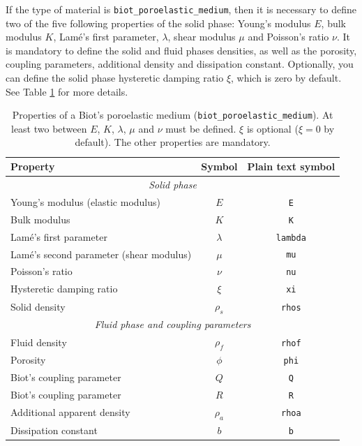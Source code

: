 \documentclass[a4paper,fleqn]{book}
\begin{document}
If the type of material is \texttt{biot\_poroelastic\_medium}, then it is necessary to define two of the five following properties of the solid phase: Young's modulus $E$, bulk modulus $K$, Lam\'e's first parameter, $\lambda$, shear modulus $\mu$ and Poisson's ratio $\nu$. It is mandatory to define the solid and fluid phases densities, as well as the porosity, coupling parameters, additional density and dissipation constant. Optionally, you can define the solid phase hysteretic damping ratio $\xi$, which is zero by default. See Table \ref{tab:poroelastic} for more details.

\begin{table}
\centering
{\small
\begin{tabular}{lcc}
\textbf{Property} & \textbf{Symbol} & \textbf{Plain text symbol} \\
\midrule
\multicolumn{3}{c}{\textit{Solid phase}} \\
\midrule
Young's modulus (elastic modulus)         & $E$       & \texttt{E}      \\
Bulk modulus                              & $K$       & \texttt{K}      \\
Lam\'e's first parameter                  & $\lambda$ & \texttt{lambda} \\
Lam\'e's second parameter (shear modulus) & $\mu$     & \texttt{mu}     \\
Poisson's ratio                           & $\nu$     & \texttt{nu}     \\
Hysteretic damping ratio                  & $\xi$     & \texttt{xi}     \\
Solid density                             & $\rho_s$  & \texttt{rhos}   \\
\midrule
\multicolumn{3}{c}{\textit{Fluid phase and coupling parameters}} \\
\midrule
Fluid density               & $\rho_f$ & \texttt{rhof} \\
Porosity                    & $\phi$   & \texttt{phi}  \\
Biot's coupling parameter   & $Q$      & \texttt{Q}    \\
Biot's coupling parameter   & $R$      & \texttt{R}    \\
Additional apparent density & $\rho_a$ & \texttt{rhoa} \\
Dissipation constant        & $b$      & \texttt{b}    \\
\end{tabular}
}
\caption{Properties of a Biot's poroelastic medium (\texttt{biot\_poroelastic\_medium}). At least two between $E$, $K$, $\lambda$, $\mu$ and $\nu$ must be defined. $\xi$ is optional ($\xi=0$ by default). The other properties are mandatory.}
\label{tab:poroelastic}
\end{table}
\end{document}
